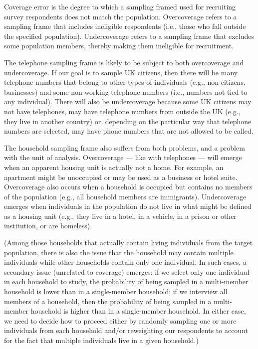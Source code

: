 \documentclass[a4paper]{exam}
\begin{document}
\begin{enumerate}
\begin{solution}

Coverage error is the degree to which a sampling framed used for recruiting survey respondents does not match the population. Overcoverage refers to a sampling frame that includes ineligible respondents (i.e., those who fall outside the specified population). Undercoverage refers to a sampling frame that excludes some population members, thereby making them ineligible for recruitment.

The telephone sampling frame is likely to be subject to both overcoverage and undercoverage. If our goal is to sample UK citizens, then there will be many telephone numbers that belong to other types of individuals (e.g., non-citizens, businesses) and some non-working telephone numbers (i.e., numbers not tied to any individual). There will also be undercoverage because some UK citizens may not have telephones, may have telephone numbers from outside the UK (e.g., they live in another country) or, depending on the particular way that telephone numbers are selected, may have phone numbers that are not allowed to be called.

The household sampling frame also suffers from both problems, and a problem with the unit of analysis. Overcoverage --- like with telephones --- will emerge when an apparent housing unit is actually not a home. For example, an apartment might be unoccupied or may be used as a business or hotel suite. Overcoverage also occurs when a household is occupied but contains no members of the population (e.g., all household members are immigrants). Undercoverage emerges when individuals in the population do not live in what might be defined as a housing unit (e.g., they live in a hotel, in a vehicle, in a prison or other institution, or are homeless).

(Among those households that actually contain living individuals from the target population, there is also the issue that the household may contain multiple individuals while other households contain only one individual. In such cases, a secondary issue (unrelated to coverage) emerges: if we select only one individual in each household to study, the probability of being sampled in a multi-member household is lower than in a single-member household; if we interview all members of a household, then the probability of being sampled in a multi-member household is higher than in a single-member household. In either case, we need to decide how to proceed either by randomly sampling one or more individuals from each household and/or reweighting our respondents to account for the fact that multiple individuals live in a given household.)


\end{solution}
\end{enumerate}
\end{document}
